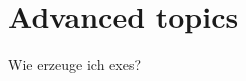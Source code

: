 %                                                                        
%                                                                        
%                                                                        
%                                                                        
%
\clearpage
\section{Advanced topics}

Wie erzeuge ich exes?
